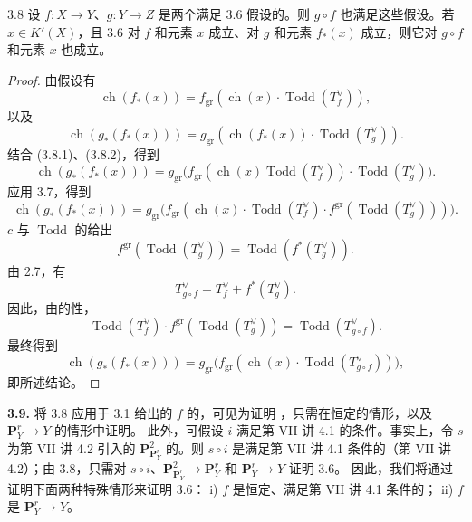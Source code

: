 \begin{SGAresult}{}{3.8}
设 $f:X\to Y$、$g:Y\to Z$ 是两个满足 3.6 假设的。则 $g\circ f$ 也满足这些假设。若 $x\in K'(X)$，且 3.6 对 $f$ 和元素 $x$ 成立、对 $g$ 和元素 $f_*(x)$ 成立，则它对 $g\circ f$ 和元素 $x$ 也成立。
\end{SGAresult}
\begin{proof}
由假设有
\[\operatorname{ch}(f_*(x))=f_{\mathrm{gr}}(\operatorname{ch}(x)\cdot\operatorname{Todd}(T_f^\vee)),\tag{3.8.1}\]
以及
\[\operatorname{ch}(g_*(f_*(x)))=g_{\mathrm{gr}}(\operatorname{ch}(f_*(x))\cdot\operatorname{Todd}(T_g^\vee)).\tag{3.8.2}\]
结合 (3.8.1)、(3.8.2)，得到
\[\operatorname{ch}(g_*(f_*(x)))=g_{\mathrm{gr}}\bigl(f_{\mathrm{gr}}(\operatorname{ch}(x)\operatorname{Todd}(T_f^\vee))\cdot\operatorname{Todd}(T_g^\vee)\bigr).\]
应用 3.7，得到
\[\operatorname{ch}(g_*(f_*(x)))=g_{\mathrm{gr}}\bigl(f_{\mathrm{gr}}(\operatorname{ch}(x)\cdot\operatorname{Todd}(T_f^\vee)\cdot f^{\mathrm{gr}}(\operatorname{Todd}(T_g^\vee)))\bigr).\]
$c$ 与 $\operatorname{Todd}$ 的给出
\[f^{\mathrm{gr}}(\operatorname{Todd}(T_g^\vee))=\operatorname{Todd}(f^*(T_g^\vee)).\]
由 2.7，有
\[T_{g\circ f}^\vee=T_f^\vee+f^*(T_g^\vee).\]
因此，由的性，
\[\operatorname{Todd}(T_f^\vee)\cdot f^{\mathrm{gr}}(\operatorname{Todd}(T_g^\vee))=\operatorname{Todd}(T_{g\circ f}^\vee).\]
最终得到
\[\operatorname{ch}(g_*(f_*(x)))=g_{\mathrm{gr}}\bigl(f_{\mathrm{gr}}(\operatorname{ch}(x)\cdot\operatorname{Todd}(T_{g\circ f}^\vee))\bigr),\]
即所述结论。
\end{proof}
\textbf{3.9.} 将 3.8 应用于 3.1 给出的 $f$ 的，可见为证明 ，只需在恒定的情形，以及 $\mathbf P^r_Y\to Y$ 的情形中证明。
此外，可假设 $i$ 满足第 VII 讲 4.1 的条件。事实上，令 $s$ 为第 VII 讲 4.2 引入的 $\mathbf P^2_{\mathbf P^r_Y}$ 的。则 $s\circ i$ 是满足第 VII 讲 4.1 条件的（第 VII 讲 4.2）；由 3.8，只需对 $s\circ i$、$\mathbf P^2_{\mathbf P^r_Y}\to\mathbf P^r_Y$ 和 $\mathbf P^r_Y\to Y$ 证明 3.6。
因此，我们将通过证明下面两种特殊情形来证明 3.6：
i) $f$ 是恒定、满足第 VII 讲 4.1 条件的；
ii) $f$ 是 $\mathbf P^r_Y\to Y$。
